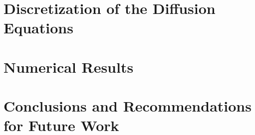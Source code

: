 \documentclass[12pt]{article}
\begin{document}
\section{Discretization of the Diffusion Equations}

\section{Numerical Results}

\section{Conclusions and Recommendations for Future Work}


\end{document}
